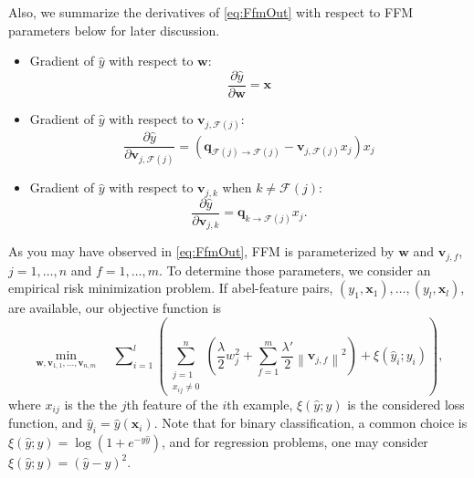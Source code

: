 \documentclass[11pt]{article}
\newcommand{\bsym}[1]{\ensuremath{\boldsymbol{#1}}}
\newcommand{\bw}{\ensuremath{\bsym{w}}}
\newcommand{\bv}{\ensuremath{\bsym{v}}}
\newcommand{\bx}{\ensuremath{\bsym{x}}}
\newcommand{\bq}{\ensuremath{\bsym{q}}}
\newcommand{\field}{\ensuremath{\mathcal F}}
\newcommand{\norm}[1]{\ensuremath{\left\| #1 \right\|}}
\begin{document}
Also, we summarize the derivatives of \eqref{eq:FfmOut} with respect to FFM parameters below for later discussion.
\begin{itemize}
    \item Gradient of $\hat{y}$ with respect to $\bw$: 
        \begin{equation}
            \frac{\partial \hat{y}}{\partial \bw} = \bx
            \label{eq:LinGrad}
        \end{equation}
    \item Gradient of $\hat{y}$ with respect to $\bv_{j, \field(j)}$:
        \begin{equation}
            \frac{\partial \hat{y}}{\partial \bv_{j, \field(j)}} = (\bq_{\field(j) \rightarrow \field(j)} - \bv_{j, \field(j)}x_j) x_j
            \label{eq:IntraGrad}
        \end{equation}
    \item Gradient of $\hat{y}$ with respect to $\bv_{j, k}$ when $k \ne \field(j)$:
        \begin{equation}
            \frac{\partial \hat{y}}{\partial \bv_{j, k}} = \bq_{k\rightarrow \field(j)} x_j.
            \label{eq:InterGrad}
        \end{equation}
\end{itemize}
As you may have observed in \eqref{eq:FfmOut}, FFM is parameterized by $\bw$ and $\bv_{j, f}$, $j=1,\dots,n$ and $f=1,\dots,m$.
To determine those parameters, we consider an empirical risk minimization problem.
If abel-feature pairs, $(y_1,\bx_1),\dots,(y_l,\bx_l)$, are available, our objective function is
\begin{equation}
    \min_{\bw, \bv_{1, 1},\dots,\bv_{n, m}} \quad  \mathcal \sum_{i=1}^l \left( \sum_{\substack{j=1 \\ x_{ij} \ne 0}}^n \left(\frac{\lambda}{2} w_j^2 + \sum_{f=1}^m \frac{\lambda'}{2} \norm{\bv_{j,f}}^2\right) + \xi(\hat{y}_i; y_i) \right),
    \label{eq:Prob}
\end{equation}
where $x_{ij}$ is the the $j$th feature of the $i$th example, $\xi(\hat{y};y)$ is the considered loss function, and $\hat{y}_i=\hat{y}(\bx_i)$.
Note that for binary classification, a common choice is $\xi(\hat{y};y) = \log(1+e^{-y\hat{y}})$, and for regression problems, one may consider $\xi(\hat{y};y) = (\hat{y}-y)^2$.
\end{document}
